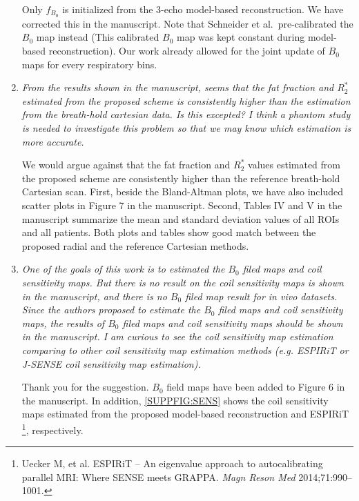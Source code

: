 \documentclass[a4paper,11pt]{report}
\begin{document}
\begin{enumerate}
\hspace{1em} Only $f_{B_0}$ is initialized from the 3-echo model-based reconstruction. 
We have corrected this in the manuscript. 
Note that Schneider et al.~pre-calibrated the $B_0$ map instead 
(This calibrated $B_0$ map was kept constant during model-based reconstruction). 
Our work already allowed for the joint update of $B_0$ maps for every respiratory bins. 



	\item \textit{From the results shown in the manuscript, seems that the fat fraction and $R_2^*$ estimated from the proposed scheme is consistently higher than the estimation from the breath-hold cartesian data. Is this excepted? I think a phantom study is needed to investigate this problem so that we may know which estimation is more accurate.}

\hspace{1em} We would argue against that the fat fraction and $R_2^*$ values 
estimated from the proposed scheme are consistently higher than 
the reference breath-hold Cartesian scan. First, beside the Bland-Altman plots, 
we have also included scatter plots in Figure 7 in the manuscript. 
Second, Tables IV and V in the manuscript summarize the mean and standard deviation values 
of all ROIs and all patients. 
Both plots and tables show good match between the proposed radial and the reference Cartesian methods.

	\item \textit{One of the goals of this work is to estimated the $B_0$ filed maps and coil sensitivity maps. But there is no result on the coil sensitivity maps is shown in the manuscript, and there is no $B_0$ filed map result for in vivo datasets. Since the authors proposed to estimate the $B_0$ filed maps and coil sensitivity maps, the results of $B_0$ filed maps and coil sensitivity maps should be shown in the manuscript. I am curious to see the coil sensitivity map estimation comparing to other coil sensitivity map estimation methods (e.g. ESPIRiT or J-SENSE coil sensitivity map estimation).}

\hspace{1em} Thank you for the suggestion. $B_0$ field maps have been added to Figure 6 in the manuscript. In addition, \cref{SUPPFIG:SENS} shows the coil sensitivity maps estimated 
from the proposed model-based reconstruction and ESPIRiT 
\footnote{Uecker M, et al. ESPIRiT -- An eigenvalue approach to autocalibrating parallel MRI: Where SENSE meets GRAPPA. \textit{Magn Reson Med} 2014;71:990--1001.}, respectively. 


\end{enumerate}
\end{document}
